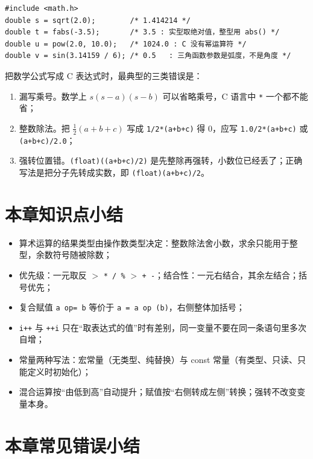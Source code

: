 \begin{lstlisting}
#include <math.h>
double s = sqrt(2.0);        /* 1.414214 */
double t = fabs(-3.5);       /* 3.5 : 实型取绝对值，整型用 abs() */
double u = pow(2.0, 10.0);   /* 1024.0 : C 没有幂运算符 */
double v = sin(3.14159 / 6); /* 0.5   : 三角函数参数是弧度，不是角度 */
\end{lstlisting}

把数学公式写成 C 表达式时，最典型的三类错误是：

\begin{enumerate}
  \item 漏写乘号。数学上 $s(s-a)(s-b)$ 可以省略乘号，C 语言中 \texttt{*} 一个都不能省；
  \item 整数除法。把 $\frac{1}{2}(a+b+c)$ 写成 \texttt{1/2*(a+b+c)} 得 0，应写 \texttt{1.0/2*(a+b+c)} 或 \texttt{(a+b+c)/2.0}；
  \item 强转位置错。\texttt{(float)((a+b+c)/2)} 是先整除再强转，小数位已经丢了；正确写法是把分子先转成实数，即 \texttt{(float)(a+b+c)/2}。
\end{enumerate}


\section{本章知识点小结}

\begin{itemize}
  \item 算术运算的结果类型由操作数类型决定：整数除法舍小数，求余只能用于整型，余数符号随被除数；
  \item 优先级：一元取反 $>$ \texttt{* / \%} $>$ \texttt{+ -}；结合性：一元右结合，其余左结合；括号优先；
  \item 复合赋值 \texttt{a op= b} 等价于 \texttt{a = a op (b)}，右侧整体加括号；
  \item \texttt{i++} 与 \texttt{++i} 只在“取表达式的值”时有差别，同一变量不要在同一条语句里多次自增；
  \item 常量两种写法：宏常量（无类型、纯替换）与 const 常量（有类型、只读、只能定义时初始化）；
  \item 混合运算按“由低到高”自动提升；赋值按“右侧转成左侧”转换；强转不改变变量本身。
\end{itemize}

\section{本章常见错误小结}

